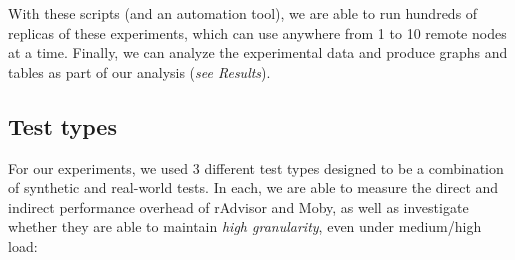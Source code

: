 \documentclass[a4paper,11pt]{article}
\newcommand{\granularity}{\textit{high granularity}\xspace}
\begin{document}
\vspace{-0.25em}
With these scripts (and an automation tool),
we are able to run hundreds of replicas of these experiments,
which can use anywhere from 1 to 10 remote nodes at a time.
Finally, we can analyze the experimental data
and produce graphs and tables as part of our analysis (\textit{see Results}).

\vspace{-0.25em}
\subsection{Test types}

For our experiments, we used 3 different test types designed to be a combination
of synthetic and real-world tests.
In each, we are able to measure the direct and indirect performance overhead of rAdvisor and Moby,
as well as investigate whether they are able to maintain \granularity,
even under medium/high load:
\end{document}
